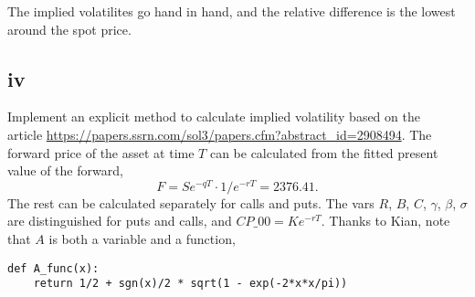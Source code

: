 \documentclass{article}
\begin{document}
The implied volatilites go hand in hand,
and the relative difference is the lowest around the spot price.

\subsection*{iv}
Implement an explicit method to calculate implied volatility based on the \\article
\url{https://papers.ssrn.com/sol3/papers.cfm?abstract_id=2908494}.
The forward price of the asset at time $T$ can be calculated
from the fitted present value of the forward,
\[F=Se^{-qT} \cdot 1/e^{-rT} = 2376.41.\]
The rest can be calculated separately for calls and puts.
The vars $R$, $B$, $C$, $\gamma$, $\beta$, $\sigma$ are distinguished for puts and calls,
and $CP\_00 = Ke^{-rT}$.
Thanks to Kian, note that $A$ is both a variable and a function,
\begin{lstlisting}
def A_func(x):
    return 1/2 + sgn(x)/2 * sqrt(1 - exp(-2*x*x/pi))
\end{lstlisting}
\end{document}

